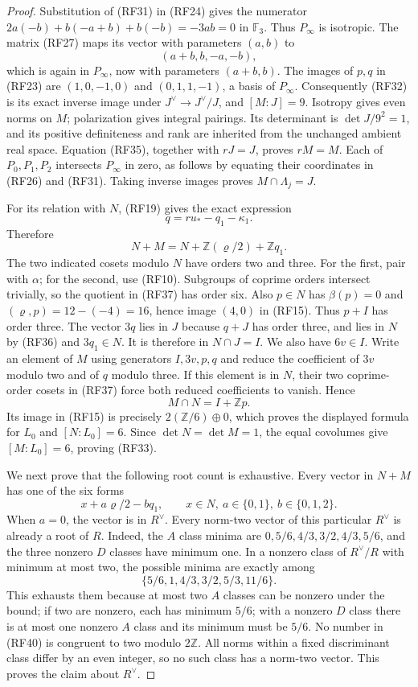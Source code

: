 \begin{proof}
Substitution of (RF31) in (RF24) gives the numerator
$2a(-b)+b(-a+b)+b(-b)=-3ab=0$ in $\mathbb F_3$.
Thus $P_\infty$ is isotropic.
The matrix (RF27) maps its vector with parameters $(a,b)$ to
\[
 (a+b,b,-a,-b),
 \tag{RF35}
\]
which is again in $P_\infty$, now with parameters $(a+b,b)$.
The images of $p,q$ in (RF23) are
$(1,0,-1,0)$ and $(0,1,1,-1)$, a basis of $P_\infty$.
Consequently (RF32) is its exact inverse image under
$J^\vee\to J^\vee/J$, and $[M:J]=9$.
Isotropy gives even norms on $M$; polarization gives integral
pairings. Its determinant is $\det J/9^2=1$, and its
positive definiteness and rank are inherited from the unchanged
ambient real space. Equation (RF35), together with $rJ=J$,
proves $rM=M$.
Each of $P_0,P_1,P_2$ intersects $P_\infty$ in zero, as follows
by equating their coordinates in (RF26) and (RF31).
Taking inverse images proves $M\cap\Lambda_j=J$.

For its relation with $N$, (RF19) gives the exact expression
\[
 q=ru_*-q_1-\kappa_1 .
 \tag{RF36}
\]
Therefore
\[
 N+M=N+\mathbb Z(\varrho/2)+\mathbb Zq_1.
 \tag{RF37}
\]
The two indicated cosets modulo $N$ have orders two and three.
For the first, pair with $\alpha$; for the second, use (RF10).
Subgroups of coprime orders intersect trivially, so the quotient
in (RF37) has order six.
Also $p\in N$ has $\beta(p)=0$ and
$(\varrho,p)=12-(-4)=16$, hence image $(4,0)$ in (RF15).
Thus $p+I$ has order three.
The vector $3q$ lies in $J$ because $q+J$ has order three,
and lies in $N$ by (RF36) and $3q_1\in N$.
It is therefore in $N\cap J=I$.
We also have $6v\in I$.
Write an element of $M$ using generators $I,3v,p,q$ and reduce
the coefficient of $3v$ modulo two and of $q$ modulo three.
If this element is in $N$, their two coprime-order cosets in
(RF37) force both reduced coefficients to vanish.
Hence
\[
 M\cap N=I+\mathbb Zp.
 \tag{RF38}
\]
Its image in (RF15) is precisely $2(\mathbb Z/6)\oplus0$,
which proves the displayed formula for $L_0$ and
$[N:L_0]=6$. Since $\det N=\det M=1$, the equal covolumes
give $[M:L_0]=6$, proving (RF33).

We next prove that the following root count is exhaustive.
Every vector in $N+M$ has one of the six forms
\[
 x+a\varrho/2-bq_1,\qquad
                   x\in N,\ a\in\{0,1\},\ b\in\{0,1,2\}.
 \tag{RF39}
\]
When $a=0$, the vector is in $R^\vee$.
Every norm-two vector of this particular $R^\vee$ is already
a root of $R$.
Indeed, the $A$ class minima are
$0,5/6,4/3,3/2,4/3,5/6$, and the three nonzero $D$ classes
have minimum one. In a nonzero class of $R^\vee/R$ with
minimum at most two, the possible minima are exactly among
\[
 \{5/6,1,4/3,3/2,5/3,11/6\}.
 \tag{RF40}
\]
This exhausts them because at most two $A$ classes can be
nonzero under the bound; if two are nonzero, each has minimum
$5/6$; with a nonzero $D$ class there is at most one nonzero
$A$ class and its minimum must be $5/6$.
No number in (RF40) is congruent to two modulo $2\mathbb Z$.
All norms within a fixed discriminant class differ by an even
integer, so no such class has a norm-two vector.
This proves the claim about $R^\vee$.


\end{proof}
